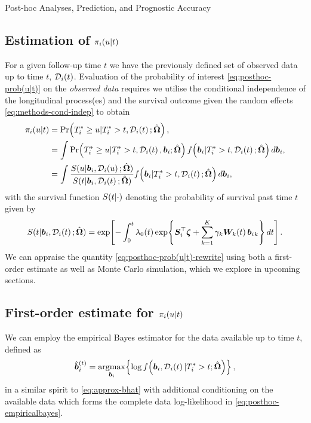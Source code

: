 \begin{chapter}{\label{cha:posthoc}Post-hoc Analyses, Prediction, and Prognostic Accuracy}
\subsection{Estimation of \texorpdfstring{$\pi_i\!\left( u |t\right)$}{piut}}\label{sec:posthoc-dynpreds-estimation}
For a given follow-up time $t$ we have the previously defined set of observed data up to time $t$, $\mathcal{D}_i\!\left( t \right)$. Evaluation of the probability of interest \eqref{eq:posthoc-prob(u|t)} on the \textit{observed data} requires we utilise the conditional independence of the longitudinal process(es) and the survival outcome given the random effects \eqref{eq:methods-cond-indep} to obtain \citep{RizopoulosJMbook}
\begin{align}
    \nonumber \pi_i\lb u|t\rb &= \Pr\lb T_i^*\ge u|T_i^*>t,\mathcal{D}_i\lb t\rb;\hbO\rb,\\
    \nonumber &= \int\Pr\lb T_i^*\ge u|T_i^*>t,\mathcal{D}_i\lb t\rb, \b;\hbO\rb f\lb \b|T_i^*>t,\mathcal{D}_i\lb t\rb; \hbO\rb d\b,\\
    &= \int\frac{S( u|\b, \mathcal{D}_i\lb u\rb; \hbO)}{S( t|\b, \mathcal{D}_i\lb t\rb; \hbO)}f\lb \b|T_i^*>t,\mathcal{D}_i\lb t \rb; \hbO\rb d\b,
\label{eq:posthoc-prob(u|t)-rewrite}
\end{align}
with the survival function $S\!\left( t|\cdot\right)$ denoting the probability of survival past time $t$ given by 
\begin{align}
    S(t|\bm{b}_i, \mathcal{D}_i\!\left( t\right); \hat{\bm{\Omega}}) = \exp\!\left[-\int_0^t\lambda_0\!\left( t \right)\exp\!\left\{\bm{S}_i^\top\bm{\zeta}+\sum_{k=1}^K\gamma_k\bm{W}_k\!\left( t\right)\bm{b}_i{_k}\right\} dt\right].
\end{align}
We can appraise the quantity \eqref{eq:posthoc-prob(u|t)-rewrite} using both a first-order estimate as well as Monte Carlo simulation, which we explore in upcoming sections.

\subsection{First-order estimate for \texorpdfstring{$\pi_i\!\left( u |t\right)$}{piut}}\label{sec:posthoc-dynpreds-estimation-FO}
We can employ the empirical Bayes estimator for the data available up to time $t$, defined as 
\begin{align}
    \hat{\bm{b}}_i^{(t)}=\underset{\bm{b}_i}{\rm{argmax}}\!\left\{\log f\!\left( \bm{b}_i,\mathcal{D}_i\!\left( t\right) |T_i^*>t;\hat{\bm{\Omega}}\right)\right\},
\label{eq:posthoc-empiricalbayes}    
\end{align}
\ie in a similar spirit to \eqref{eq:approx-bhat} with additional conditioning on the available data which forms the complete data log-likelihood in \eqref{eq:posthoc-empiricalbayes}. 


\end{chapter}
